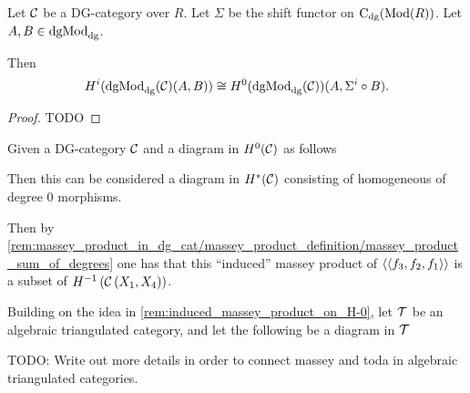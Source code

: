 
\begin{proposition}
    Let \( {\mathcal{C}} \) be a DG-category over \( R \). Let \( \Sigma \) be the shift functor on \( \operatorname{C}_{\operatorname{dg}}(\operatorname{Mod}(R)) \). Let \( A, B \in \operatorname{dgMod}_{\operatorname{dg}} \).

    Then
    \[
        H^i(\operatorname{dgMod}_{\operatorname{dg}}({\mathcal{C}})(A, B)) \cong H^0(\operatorname{dgMod}_{\operatorname{dg}}({\mathcal{C}}))(A, \Sigma^i \circ B).
    \]
\end{proposition}
\begin{proof}
    TODO
\end{proof}

\begin{remark}
    \label{rem:induced_massey_product_on_H-0}
    Given a DG-category \( {\mathcal{C}} \) and a diagram in \( H^0({\mathcal{C}}) \) as follows
    \begin{center}
    \end{center}
    Then this can be considered a diagram in \( H^*({\mathcal{C}}) \) consisting of homogeneous of degree \( 0 \) morphisms.

    Then by \autoref{rem:massey_product_in_dg_cat/massey_product_definition/massey_product_sum_of_degrees} one has that this ``induced'' massey product of \( \langle\langle f_3, f_2, f_1 \rangle\rangle \) is a subset of \( H^{-1} \left( {\mathcal{C}} \left( X_1, X_4 \right) \right) \).
\end{remark}

\begin{remark}
    Building on the idea in \autoref{rem:induced_massey_product_on_H-0}, let \( {\mathcal{T}} \) be an algebraic triangulated category, and let the following be a diagram in \( {\mathcal{T}} \)
    \begin{center}
    \end{center}

    TODO: Write out more details in order to connect massey and toda in algebraic triangulated categories.
\end{remark}

